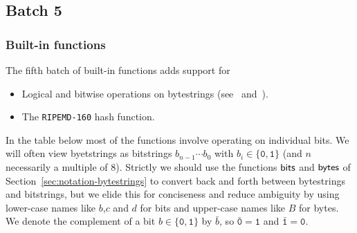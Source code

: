 \renewcommand{\note}[1]{
  \bigskip
  \refstepcounter{notenumberE}
  \noindent\textbf{Note \thenotenumberE. #1}
}

\newcommand\Xand{\mathsf{and}}
\newcommand\Xor{\mathsf{or}}
\newcommand\Xxor{\mathsf{xor}}
\newcommand{\bitzero}{\mathtt{0}}
\newcommand{\bitone}{\mathtt{1}}
\newcommand{\trunc}{\mathbf{\mathsf{trunc}}}
\newcommand{\ext}{\mathbf{\textsf{ext}}}

\subsection{Batch 5}
\label{sec:default-builtins-5}

\subsubsection{Built-in functions}
\label{sec:built-in-functions-5}
The fifth batch of built-in functions adds support for
\begin{itemize}
\item Logical and bitwise operations on bytestrings (see~\cite{CIP-0122} and~\cite{CIP-0123}).
\item The \texttt{RIPEMD-160} hash function.
\end{itemize}

\noindent In the table below most of the functions involve operating on individual bits.
We will often view byetstrings as bitstrings $b_{n-1}\cdots b_0$ with
$b_i \in \{\bitzero,\bitone\}$ (and $n$ necessarily a multiple of 8).  Strictly
we should use the functions $\mathsf{bits}$ and $\mathsf{bytes}$ of
Section~\ref{sec:notation-bytestrings} to convert back and forth between
bytestrings and bitstrings, but we elide this for conciseness and reduce
ambiguity by using lower-case names like $b$,$c$ and $d$ for bits and upper-case
names like $B$ for bytes. We denote the complement of a bit
$b \in \{\bitzero,\bitone\}$ by $\bar{b}$, so $\bar{\bitzero} = \bitone$ and
$\bar{\bitone} = \bitzero$.


